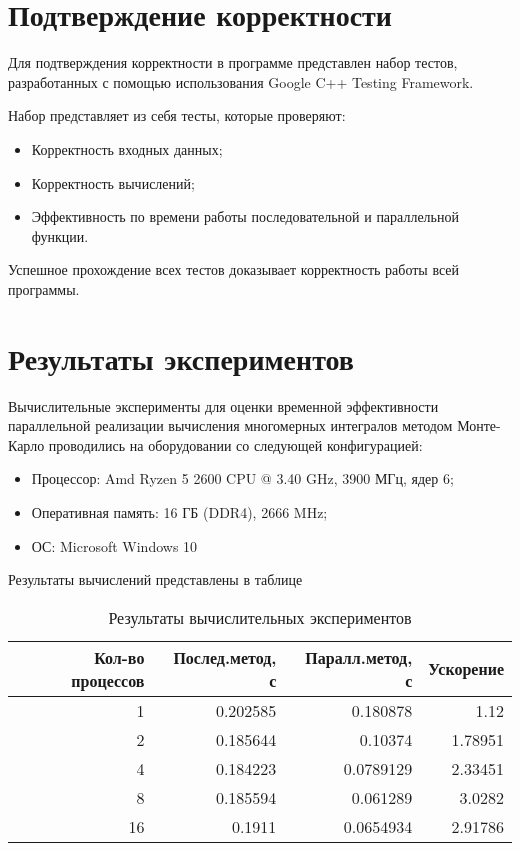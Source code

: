 \documentclass{report}
\begin{document}
\section*{Подтверждение корректности}
Для подтверждения корректности в программе представлен набор тестов, разработанных с помощью использования Google C++ Testing Framework.
\par Набор представляет из себя тесты, которые проверяют:
\begin{itemize}
\item Корректность входных данных;
\item Корректность вычислений;
\item Эффективность по времени работы последовательной и параллельной функции.
\end{itemize}
\par Успешное прохождение всех тестов доказывает корректность работы всей программы.
\newpage

\section*{Результаты экспериментов}
Вычислительные эксперименты для оценки временной эффективности параллельной реализации вычисления многомерных интегралов методом Монте-Карло проводились на оборудовании со следующей конфигурацией:

\begin{itemize}
\item Процессор: Amd Ryzen 5 2600 CPU @ 3.40 GHz, 3900 МГц, ядер 6;
\item Оперативная память: 16 ГБ (DDR4), 2666 MHz;
\item ОС: Microsoft Windows 10 
\end{itemize}

\par Результаты вычислений представлены в таблице

\begin{table}[!h]
\caption{Результаты вычислительных экспериментов}
\centering
\begin{tabular}{| r | r | r | r |}
\hline
Кол-во процессов & Послед.метод, с & Паралл.метод, с & Ускорение  \\[5pt]
\hline
1        & 0.202585        & 0.180878     & 1.12       \\
2        & 0.185644        & 0.10374     & 1.78951       \\
4        & 0.184223        & 0.0789129     & 2.33451       \\
8        & 0.185594        & 0.061289     & 3.0282       \\
16       & 0.1911        &  0.0654934     &  2.91786	  \\
\hline
\end{tabular}
\end{table}
\end{document}
